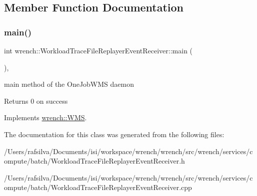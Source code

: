 \subsection{Member Function Documentation}
\mbox{\label{classwrench_1_1_workload_trace_file_replayer_event_receiver_af8ddb6f527d5f49a8b67bcc8a184c628}} 
\subsubsection{\texorpdfstring{main()}{main()}}
{\footnotesize\ttfamily int wrench\+::\+Workload\+Trace\+File\+Replayer\+Event\+Receiver\+::main (\begin{DoxyParamCaption}{ }\end{DoxyParamCaption})\hspace{0.3cm}{\ttfamily [override]}, {\ttfamily [virtual]}}



main method of the One\+Job\+W\+MS daemon 

\begin{DoxyReturn}{Returns}
0 on success 
\end{DoxyReturn}


Implements \hyperlink{classwrench_1_1_w_m_s}{wrench\+::\+W\+MS}.



The documentation for this class was generated from the following files\+:\begin{DoxyCompactItemize}
\item 
/\+Users/rafsilva/\+Documents/isi/workspace/wrench/wrench/src/wrench/services/compute/batch/Workload\+Trace\+File\+Replayer\+Event\+Receiver.\+h\item 
/\+Users/rafsilva/\+Documents/isi/workspace/wrench/wrench/src/wrench/services/compute/batch/Workload\+Trace\+File\+Replayer\+Event\+Receiver.\+cpp\end{DoxyCompactItemize}
